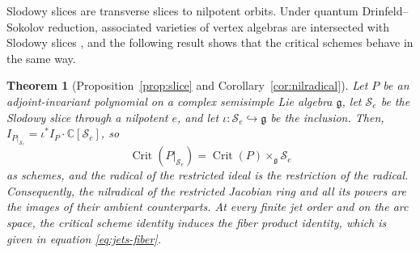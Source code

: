 \documentclass[10pt,reqno]{amsart}
\numberwithin{equation}{section}
\theoremstyle{plain}
\newtheorem{theorem}{Theorem}[section]
\theoremstyle{definition}
\DeclareMathOperator{\Crit}{Crit}
\begin{document}
Slodowy slices \cite{Slodowy} are transverse slices to nilpotent orbits. Under quantum Drinfeld--Sokolov reduction, associated varieties of vertex algebras are intersected with Slodowy slices \cite{ArakawaW}, and the following result shows that the critical schemes behave in the same way.

\begin{theorem}[Proposition~\ref{prop:slice} and Corollary~\ref{cor:nilradical}]\label{thm:mainD}
Let $P$ be an adjoint-invariant polynomial on a complex semisimple Lie algebra $\mathfrak{g}$, let $\mathcal{S}_e$ be the Slodowy slice through a nilpotent $e$, and let $\iota:\mathcal{S}_e\hookrightarrow\mathfrak{g}$ be the inclusion. Then, $I_{P|_{\mathcal{S}_e}}=\iota^*I_P\cdot\mathbb{C}[\mathcal{S}_e]$, so 
\begin{equation*}
    \Crit(P|_{\mathcal{S}_e})=\Crit(P)\times_\mathfrak{g}\mathcal{S}_e
\end{equation*}
as schemes, and the radical of the restricted ideal is the restriction of the radical. Consequently, the nilradical of the restricted Jacobian ring and all its powers are the images of their ambient counterparts. At every finite jet order and on the arc space, the critical scheme identity induces the fiber product identity, which is given in equation \eqref{eq:jets-fiber}.
\end{theorem}
\end{document}
